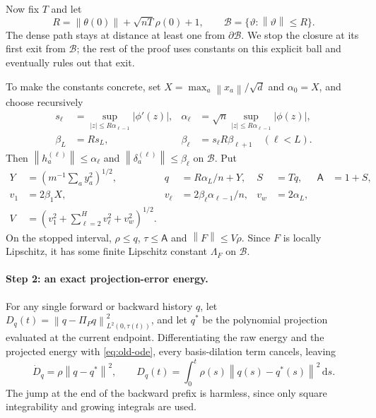 \documentclass[11pt]{article}
\theoremstyle{definition}
\theoremstyle{remark}
\newcommand{\norm}[1]{\left\lVert #1\right\rVert}
\newcommand{\dd}{\,\mathrm{d}}
\begin{document}
Now fix $T$ and let
\[
 R=\norm{\theta(0)}+\sqrt{nT}\rho(0)+1,
 \qquad \mathcal B=\{\vartheta:\norm{\vartheta}\le R\}.
\]
The dense path stays at distance at least one from $\partial\mathcal B$.  We
stop the closure at its first exit from $\mathcal B$; the rest of the proof uses
constants on this explicit ball and eventually rules out that exit.

To make the constants concrete, set $X=\max_a\norm{x_a}/\sqrt d$ and $\alpha_0=X$, and
choose recursively
\begin{align}
 s_\ell&=\sup_{|z|\le R\alpha_{\ell-1}}|\phi'(z)|,&
 \alpha_\ell&=\sqrt n\sup_{|z|\le R\alpha_{\ell-1}}|\phi(z)|,\nonumber\\
 \beta_L&=R s_L,& \beta_\ell&=s_\ell R\beta_{\ell+1}\quad(\ell<L).
                                                               \label{eq:response-bounds}
\end{align}
Then $\norm{h_a^{(\ell)}}\le\alpha_\ell$ and
$\norm{\delta_a^{(\ell)}}\le\beta_\ell$ on $\mathcal B$.  Put
\begin{align}
 Y&=\left(m^{-1}\sum_a y_a^2\right)^{1/2},&
 q&=R\alpha_L/n+Y,& S&=Tq,& \mathsf A&=1+S,\nonumber\\
 v_1&=2\beta_1X,&
 v_\ell&=2\beta_\ell\alpha_{\ell-1}/n,& v_w&=2\alpha_L,\nonumber\\
 V&=\left(v_1^2+\sum_{\ell=2}^Hv_\ell^2+v_w^2\right)^{1/2}. \label{eq:compact-constants}
\end{align}
On the stopped interval, $\rho\le q$, $\tau\le\mathsf A$ and
$\norm{F}\le V\rho$.  Since $F$ is locally Lipschitz, it has some finite
Lipschitz constant $\Lambda_F$ on $\mathcal B$.

\paragraph{Step 2: an exact projection-error energy.}
For any single forward or backward history $q$, let
$D_q(t)=\norm{q-\Pi_Pq}_{L^2(0,\tau(t))}^2$, and let $q^*$ be the polynomial
projection evaluated at the current endpoint.  Differentiating the raw energy
and the projected energy with \eqref{eq:old-ode}, every basis-dilation term
cancels, leaving
\begin{equation}
 \dot D_q=\rho\norm{q-q^*}^2,
 \qquad D_q(t)=\int_0^t\rho(s)\norm{q(s)-q^*(s)}^2\dd s. \label{eq:projection-energy}
\end{equation}
The jump at the end of the backward prefix is harmless, since only square
integrability and growing integrals are used.
\end{document}
